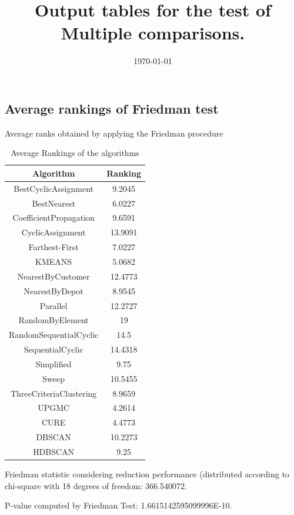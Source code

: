 \documentclass[a4paper,10pt]{article}
\title{Output tables for the test of Multiple comparisons.}
\author{}
\date{\today}
\begin{document}
\begin{landscape}
\pagestyle{empty}
\maketitle
\thispagestyle{empty}
\section{Average rankings of Friedman test}



Average ranks obtained by applying the Friedman procedure

\begin{table}[!htp]
\centering
\begin{tabular}{|c|c|}\hline
Algorithm&Ranking\\\hline
BestCyclicAssignment & 9.2045\\
BestNearest & 6.0227\\
CoefficientPropagation & 9.6591\\
CyclicAssignment & 13.9091\\
Farthest-First & 7.0227\\
KMEANS & 5.0682\\
NearestByCustomer & 12.4773\\
NearestByDepot & 8.9545\\
Parallel & 12.2727\\
RandomByElement & 19\\
RandomSequentialCyclic & 14.5\\
SequentialCyclic & 14.4318\\
Simplified & 9.75\\
Sweep & 10.5455\\
ThreeCriteriaClustering & 8.9659\\
UPGMC & 4.2614\\
CURE & 4.4773\\
DBSCAN & 10.2273\\
HDBSCAN & 9.25\\
\hline
\end{tabular}
\caption{Average Rankings of the algorithms}
\end{table}

Friedman statistic considering reduction performance (distributed according to chi-square with 18 degrees of freedom: 366.540072.

P-value computed by Friedman Test: 1.6615142595099996E-10.\newline


\end{landscape}
\end{document}
